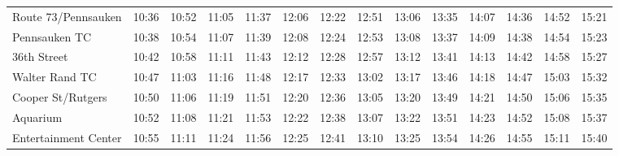 \begin{center}
\begin{tabular}{@{}lrrrrrrrrrrrrr@{}}
Route 73/Pennsauken & 10:36 & 10:52 & 11:05 & 11:37 & 12:06 & 12:22 & 12:51 & 13:06 & 13:35 & 14:07 & 14:36 & 14:52 & 15:21 \\
Pennsauken TC & 10:38 & 10:54 & 11:07 & 11:39 & 12:08 & 12:24 & 12:53 & 13:08 & 13:37 & 14:09 & 14:38 & 14:54 & 15:23 \\
36th Street & 10:42 & 10:58 & 11:11 & 11:43 & 12:12 & 12:28 & 12:57 & 13:12 & 13:41 & 14:13 & 14:42 & 14:58 & 15:27 \\
Walter Rand TC & 10:47 & 11:03 & 11:16 & 11:48 & 12:17 & 12:33 & 13:02 & 13:17 & 13:46 & 14:18 & 14:47 & 15:03 & 15:32 \\
Cooper St/Rutgers & 10:50 & 11:06 & 11:19 & 11:51 & 12:20 & 12:36 & 13:05 & 13:20 & 13:49 & 14:21 & 14:50 & 15:06 & 15:35 \\
Aquarium & 10:52 & 11:08 & 11:21 & 11:53 & 12:22 & 12:38 & 13:07 & 13:22 & 13:51 & 14:23 & 14:52 & 15:08 & 15:37 \\
Entertainment Center & 10:55 & 11:11 & 11:24 & 11:56 & 12:25 & 12:41 & 13:10 & 13:25 & 13:54 & 14:26 & 14:55 & 15:11 & 15:40 \\
\bottomrule\end{tabular}\end{center}
